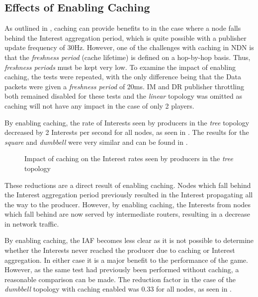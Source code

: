 \subsection{Effects of Enabling Caching}
As outlined in , caching can provide benefits to \game{} in the case where a node falls behind the Interest aggregation period, which is quite possible with a publisher update frequency of 30Hz. However, one of the challenges with caching in NDN is that the \textit{freshness period} (cache lifetime) is defined on a hop-by-hop basis. Thus, \textit{freshness periods} must be kept very low. To examine the impact of enabling caching, the tests were repeated, with the only difference being that the Data packets were given a \textit{freshness period} of 20ms. IM and DR publisher throttling both remained disabled for these tests and the \textit{linear} topology was omitted as caching will not have any impact in the case of only 2 players.

By enabling caching, the rate of Interests seen by producers in the \textit{tree} topology decreased by 2 Interests per second for all nodes, as seen in . The results for the \textit{square} and \textit{dumbbell} were very similar and can be found in .

\begin{figure}[H]
    \centering
    \caption{Impact of caching on the Interest rates seen by producers in the \textit{tree} topology}
    \label{fig:eval:caching:interest-impact-tree}
\end{figure}

These reductions are a direct result of enabling caching. Nodes which fall behind the Interest aggregation period previously resulted in the Interest propagating all the way to the producer. However, by enabling caching, the Interests from nodes which fall behind are now served by intermediate routers, resulting in a decrease in network traffic.

By enabling caching, the IAF becomes less clear as it is not possible to determine whether the Interests never reached the producer due to caching or Interest aggregation. In either case it is a major benefit to the performance of the game. However, as the same test had previously been performed without caching, a reasonable comparison can be made. The reduction factor in the case of the \textit{dumbbell} topology with caching enabled was 0.33 for all nodes, as seen in .  

